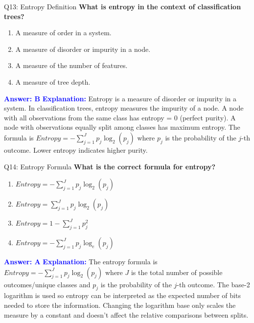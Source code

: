 \documentclass[8pt]{beamer}
\begin{document}
	\begin{frame}{Q13: Entropy Definition}
		\fontsize{6.5}{7.5}\selectfont
		\textbf{What is entropy in the context of classification trees?}
		\begin{enumerate}
			\item A measure of order in a system.
			\item A measure of disorder or impurity in a node.
			\item A measure of the number of features.
			\item A measure of tree depth.
		\end{enumerate}
		\vspace{0.1cm}
		\textcolor{blue}{\textbf{Answer: B}}
		\vspace{0.1cm}
		\textcolor{blue}{\textbf{Explanation:}} Entropy is a measure of disorder or impurity in a system. In classification trees, entropy measures the impurity of a node. A node with all observations from the same class has entropy = 0 (perfect purity). A node with observations equally split among classes has maximum entropy. The formula is $Entropy = -\sum_{j=1}^J p_j \log_2(p_j)$ where $p_j$ is the probability of the $j$-th outcome. Lower entropy indicates higher purity.
	\end{frame}
	
	\begin{frame}{Q14: Entropy Formula}
		\fontsize{6.5}{7.5}\selectfont
		\textbf{What is the correct formula for entropy?}
		\begin{enumerate}
			\item $Entropy = -\sum_{j=1}^J p_j \log_2(p_j)$
			\item $Entropy = \sum_{j=1}^J p_j \log_2(p_j)$
			\item $Entropy = 1 - \sum_{j=1}^J p_j^2$
			\item $Entropy = -\sum_{j=1}^J p_j \log_e(p_j)$
		\end{enumerate}
		\vspace{0.1cm}
		\textcolor{blue}{\textbf{Answer: A}}
		\vspace{0.1cm}
		\textcolor{blue}{\textbf{Explanation:}} The entropy formula is $Entropy = -\sum_{j=1}^J p_j \log_2(p_j)$ where $J$ is the total number of possible outcomes/unique classes and $p_j$ is the probability of the $j$-th outcome. The base-2 logarithm is used so entropy can be interpreted as the expected number of bits needed to store the information. Changing the logarithm base only scales the measure by a constant and doesn't affect the relative comparisons between splits.
	\end{frame}
	
\end{document}
